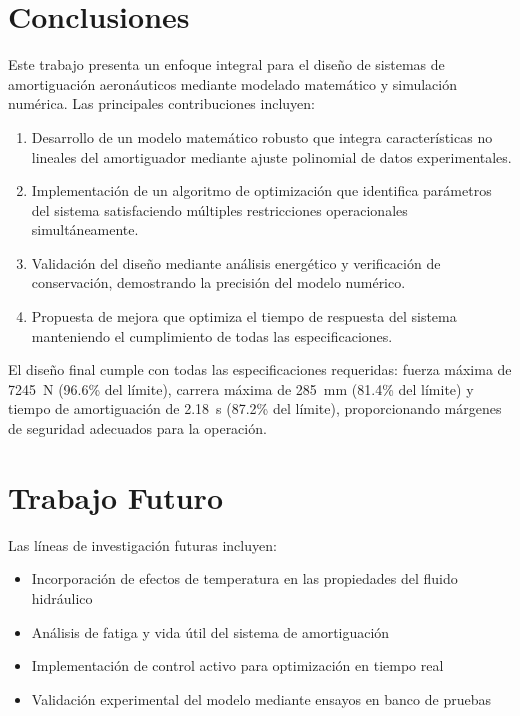 \documentclass[journal]{IEEEtran}
\begin{document}
\section{Conclusiones}

Este trabajo presenta un enfoque integral para el diseño de sistemas de amortiguación aeronáuticos mediante modelado matemático y simulación numérica. Las principales contribuciones incluyen:

\begin{enumerate}
\item Desarrollo de un modelo matemático robusto que integra características no lineales del amortiguador mediante ajuste polinomial de datos experimentales.

\item Implementación de un algoritmo de optimización que identifica parámetros del sistema satisfaciendo múltiples restricciones operacionales simultáneamente.

\item Validación del diseño mediante análisis energético y verificación de conservación, demostrando la precisión del modelo numérico.

\item Propuesta de mejora que optimiza el tiempo de respuesta del sistema manteniendo el cumplimiento de todas las especificaciones.
\end{enumerate}

El diseño final cumple con todas las especificaciones requeridas: fuerza máxima de \SI{7245}{\newton} (96.6\% del límite), carrera máxima de \SI{285}{\milli\meter} (81.4\% del límite) y tiempo de amortiguación de \SI{2.18}{\second} (87.2\% del límite), proporcionando márgenes de seguridad adecuados para la operación.

\section{Trabajo Futuro}

Las líneas de investigación futuras incluyen:
\begin{itemize}
\item Incorporación de efectos de temperatura en las propiedades del fluido hidráulico
\item Análisis de fatiga y vida útil del sistema de amortiguación
\item Implementación de control activo para optimización en tiempo real
\item Validación experimental del modelo mediante ensayos en banco de pruebas
\end{itemize}
\end{document}
